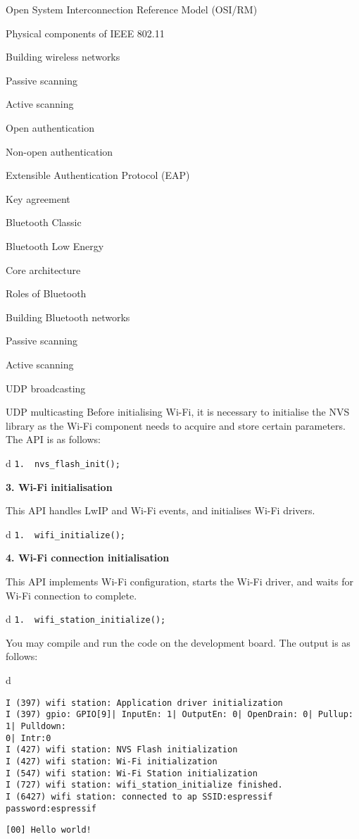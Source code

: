 \documentclass[a4paper,12pt]{book}
\begin{document}
\begin{term}{Open System Interconnection Reference Model (OSI/RM)}
\begin{term}{Physical components of IEEE 802.11}
\begin{term}{Building wireless networks}
\begin{term}{Passive scanning}
\begin{term}{Active scanning}
\begin{term}{Open authentication}
\begin{term}{Non-open authentication}
\begin{term}{Extensible Authentication Protocol (EAP)}
\begin{term}{Key agreement}
\begin{term}{Bluetooth Classic}
\begin{term}{Bluetooth Low Energy}
\begin{term}{Core architecture}
\begin{term}{Roles of Bluetooth}
\begin{term}{Building Bluetooth networks}
\begin{term}{Passive scanning}
\begin{term}{Active scanning}
\begin{term}{UDP broadcasting}
\begin{term}{UDP multicasting}
Before initialising Wi-Fi, it is necessary to initialise the NVS library as the Wi-Fi component needs to acquire and store certain parameters. The API is as follows:


\begin{tabular}{d}
\verb|1.  nvs_flash_init();|
\end{tabular}


\textbf{3. Wi-Fi initialisation}

This API handles LwIP and Wi-Fi events, and initialises Wi-Fi drivers.


\begin{tabular}{d}
\verb|1.  wifi_initialize();|
\end{tabular}


\textbf{4. Wi-Fi connection initialisation}

This API implements Wi-Fi configuration, starts the Wi-Fi driver, and waits for Wi-Fi connection to complete.


\begin{tabular}{d}
\verb|1.  wifi_station_initialize();|
\end{tabular}



You may compile and run the code on the development board. The output is as follows:


\fontsize{9.7pt}{9.7pt}\selectfont
\begin{tabular}{d}
\vspace{2pt}
\begin{verbatim}
I (397) wifi station: Application driver initialization
I (397) gpio: GPIO[9]| InputEn: 1| OutputEn: 0| OpenDrain: 0| Pullup: 1| Pulldown: 
0| Intr:0
I (427) wifi station: NVS Flash initialization
I (427) wifi station: Wi-Fi initialization
I (547) wifi station: Wi-Fi Station initialization
I (727) wifi station: wifi_station_initialize finished.
I (6427) wifi station: connected to ap SSID:espressif password:espressif
\end{verbatim}
\verb|[00] Hello world!|
\end{tabular}



\end{term}
\end{term}
\end{term}
\end{term}
\end{term}
\end{term}
\end{term}
\end{term}
\end{term}
\end{term}
\end{term}
\end{term}
\end{term}
\end{term}
\end{term}
\end{term}
\end{term}
\end{term}
\end{document}
